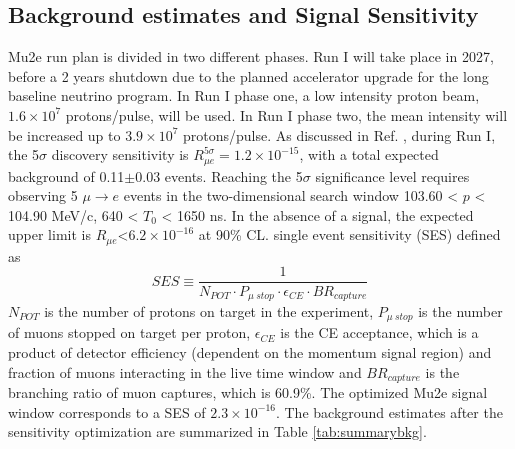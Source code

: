 \subsection{Background estimates and Signal Sensitivity}
Mu2e run plan is divided in two different phases. Run I 
will take place in 2027, before a 2 years shutdown due to the 
planned accelerator upgrade for the long baseline neutrino 
program. In Run I phase one, a low intensity proton beam, 
$1.6 \times 10^7$ protons/pulse, will be used. In Run I 
phase two, the mean intensity will be increased up to $3.9 \times 10^7$ 
protons/pulse. As discussed in Ref. \cite{universe9010054}, during Run I, the 5$\sigma$ discovery sensitivity is 
$R_{\mu e}^{5 \sigma} = 1.2 \times 10^{-15}$, with a 
total expected background of 0.11$\pm$0.03 events. 
Reaching the 5$\sigma$ significance level requires 
observing 5 $\mu\rightarrow e$ events in the two-dimensional search window 
103.60 < $p$ < 104.90 MeV/c, 640 < $T_0$ < 1650 ns. In the 
absence of a signal, the expected upper limit is $R_{\mu e}$<$6.2 \times 10^{-16}$
at 90\% CL. 
 single event sensitivity (SES) \del{,} defined as
\begin{equation}
    SES \equiv \frac{1}{N_{POT} \cdot P_{\mu \ stop} \cdot \epsilon_{CE} \cdot BR_{capture}}
\end{equation} 
 $N_{POT}$ is the number of protons on target in the experiment, 
$P_{\mu \ stop}$ is the number of muons stopped on target per 
proton, $\epsilon_{CE}$ is the CE acceptance, which is a product 
of detector efficiency (dependent on the momentum signal region) 
and fraction of muons interacting in the live time window and 
$BR_{capture}$ is the branching ratio of muon captures, which 
is 60.9\%. The optimized Mu2e signal window corresponds to a 
SES of $2.3 \times 10^{-16}$. The background estimates after 
the sensitivity optimization are summarized in Table \ref{tab:summarybkg}.

